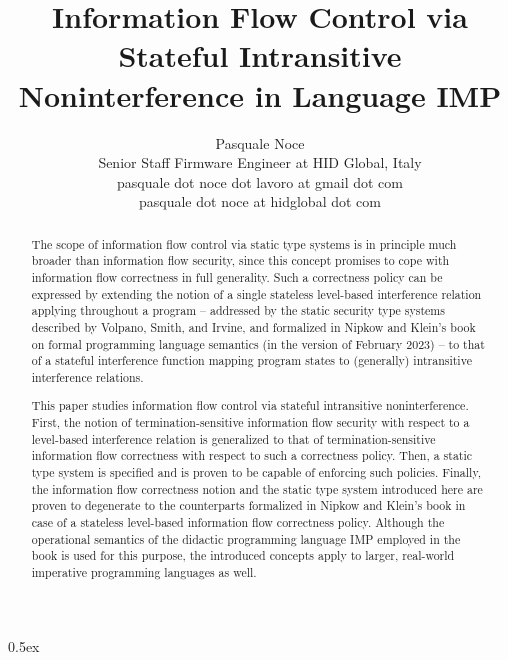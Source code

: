 \documentclass[11pt,a4paper,fleqn]{article}
\begin{document}
\lstset{
  basicstyle = \small\ttfamily,
  frame = tb,
  keywordstyle = \bfseries,
  language = C,
  numbers = left,
  numberstyle = \tiny
}

\title{Information Flow Control via Stateful Intransitive\\Noninterference in Language IMP}
\author{Pasquale Noce\\Senior Staff Firmware Engineer at HID Global, Italy\\pasquale dot noce dot lavoro at gmail dot com\\pasquale dot noce at hidglobal dot com}
\maketitle

\begin{abstract}
The scope of information flow control via static type systems is in principle much broader than
information flow security, since this concept promises to cope with information flow correctness in
full generality. Such a correctness policy can be expressed by extending the notion of a single
stateless level-based interference relation applying throughout a program -- addressed by the static
security type systems described by Volpano, Smith, and Irvine, and formalized in Nipkow and Klein's
book on formal programming language semantics (in the version of February 2023) -- to that of a
stateful interference function mapping program states to (generally) intransitive interference
relations.

This paper studies information flow control via stateful intransitive noninterference. First, the
notion of termination-sensitive information flow security with respect to a level-based interference
relation is generalized to that of termination-sensitive information flow correctness with respect
to such a correctness policy. Then, a static type system is specified and is proven to be capable of
enforcing such policies. Finally, the information flow correctness notion and the static type system
introduced here are proven to degenerate to the counterparts formalized in Nipkow and Klein's book
in case of a stateless level-based information flow correctness policy. Although the operational
semantics of the didactic programming language IMP employed in the book is used for this purpose,
the introduced concepts apply to larger, real-world imperative programming languages as well.
\end{abstract}

\tableofcontents

\parindent 0pt\parskip 0.5ex





\end{document}
